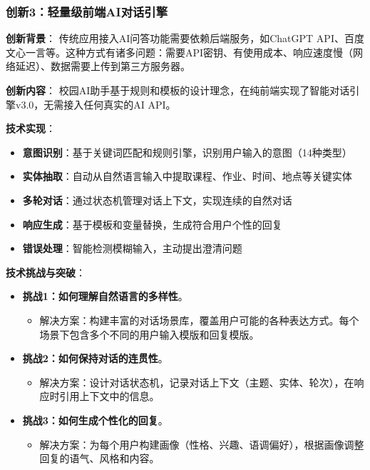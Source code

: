 \documentclass[12pt,a4paper]{article}
\begin{document}
\subsubsection{创新3：轻量级前端AI对话引擎}

\textbf{创新背景}：
传统应用接入AI问答功能需要依赖后端服务，如ChatGPT API、百度文心一言等。这种方式有诸多问题：需要API密钥、有使用成本、响应速度慢（网络延迟）、数据需要上传到第三方服务器。

\textbf{创新内容}：
校园AI助手基于规则和模板的设计理念，在纯前端实现了智能对话引擎v3.0，无需接入任何真实的AI API。

\textbf{技术实现}：
\begin{itemize}
    \item \textbf{意图识别}：基于关键词匹配和规则引擎，识别用户输入的意图（14种类型）
    \item \textbf{实体抽取}：自动从自然语言输入中提取课程、作业、时间、地点等关键实体
    \item \textbf{多轮对话}：通过状态机管理对话上下文，实现连续的自然对话
    \item \textbf{响应生成}：基于模板和变量替换，生成符合用户个性的回复
    \item \textbf{错误处理}：智能检测模糊输入，主动提出澄清问题
\end{itemize}

\textbf{技术挑战与突破}：
\begin{itemize}
    \item \textbf{挑战1：如何理解自然语言的多样性}。
        \begin{itemize}
            \item 解决方案：构建丰富的对话场景库，覆盖用户可能的各种表达方式。每个场景下包含多个不同的用户输入模版和回复模版。
        \end{itemize}
    \item \textbf{挑战2：如何保持对话的连贯性}。
        \begin{itemize}
            \item 解决方案：设计对话状态机，记录对话上下文（主题、实体、轮次），在响应时引用上下文中的信息。
        \end{itemize}
    \item \textbf{挑战3：如何生成个性化的回复}。
        \begin{itemize}
            \item 解决方案：为每个用户构建画像（性格、兴趣、语调偏好），根据画像调整回复的语气、风格和内容。
        \end{itemize}
\end{itemize}
\end{document}
